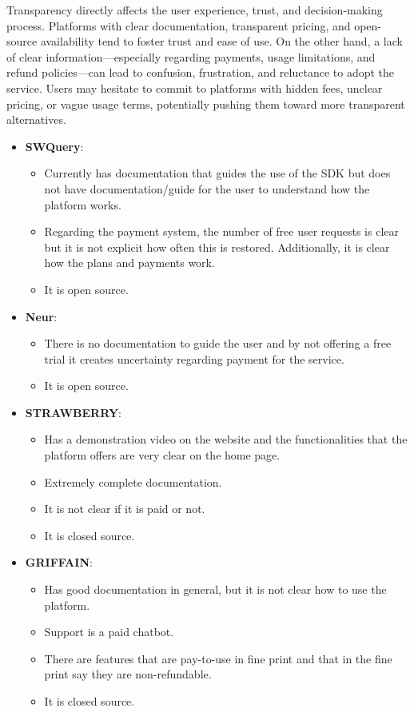 \documentclass[
]{article}
\providecommand{\tightlist}{%
  \setlength{\itemsep}{0pt}\setlength{\parskip}{0pt}}
\begin{document}
Transparency directly affects the user experience, trust, and
decision-making process. Platforms with clear documentation, transparent
pricing, and open-source availability tend to foster trust and ease of
use. On the other hand, a lack of clear information---especially
regarding payments, usage limitations, and refund policies---can lead to
confusion, frustration, and reluctance to adopt the service. Users may
hesitate to commit to platforms with hidden fees, unclear pricing, or
vague usage terms, potentially pushing them toward more transparent
alternatives.

\begin{itemize}
\tightlist
\item
  \textbf{SWQuery}:

  \begin{itemize}
  \tightlist
  \item
    Currently has documentation that guides the use of the SDK but does
    not have documentation/guide for the user to understand how the
    platform works.
  \item
    Regarding the payment system, the number of free user requests is
    clear but it is not explicit how often this is restored.
    Additionally, it is clear how the plans and payments work.
  \item
    It is open source.
  \end{itemize}
\item
  \textbf{Neur}:

  \begin{itemize}
  \tightlist
  \item
    There is no documentation to guide the user and by not offering a
    free trial it creates uncertainty regarding payment for the service.
  \item
    It is open source.
  \end{itemize}
\item
  \textbf{STRAWBERRY}:

  \begin{itemize}
  \tightlist
  \item
    Has a demonstration video on the website and the functionalities
    that the platform offers are very clear on the home page.
  \item
    Extremely complete documentation.
  \item
    It is not clear if it is paid or not.
  \item
    It is closed source.
  \end{itemize}
\item
  \textbf{GRIFFAIN}:

  \begin{itemize}
  \tightlist
  \item
    Has good documentation in general, but it is not clear how to use
    the platform.
  \item
    Support is a paid chatbot.
  \item
    There are features that are pay-to-use in fine print and that in the
    fine print say they are non-refundable.
  \item
    It is closed source.
  \end{itemize}
\end{itemize}
\end{document}
